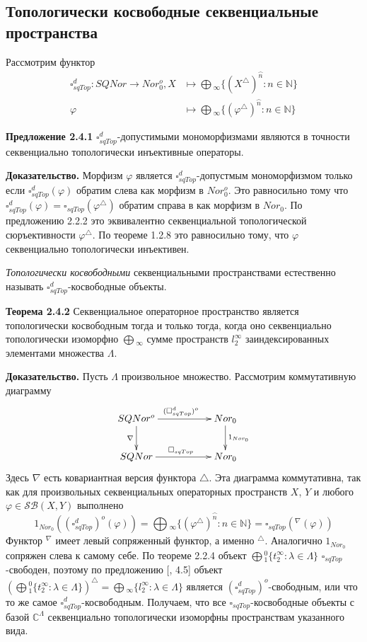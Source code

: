 \documentclass[12pt]{article}
\begin{document}
\subsection{Топологически косвободные секвенциальные пространства}

Рассмотрим 
функтор 
$$
\begin{aligned}
\square_{sqTop}^d : SQNor \to Nor_0^o, X &\mapsto \bigoplus{}_\infty \{(X^{\triangle })^{\wideparen{n}} : n \in \mathbb{N}\}\\
\varphi&\mapsto\bigoplus{}_\infty \{(\varphi^\triangle )^{\wideparen{n}} : n \in \mathbb{N}\}
\end{aligned}
$$

{\bf Предложение 2.4.1}
$\square_{sqTop}^d$-допустимыми мономорфизмами являются в точности секвенциально топологически инъективные операторы.

{\bf Доказательство.}  Морфизм $\varphi$ является $\square_{sqTop}^d$-допустмым мономорфизмом только если $\square_{sqTop}^d(\varphi)$ обратим слева как морфизм в $Nor_0^o$. Это равносильно тому что 
$\square_{sqTop}^d(\varphi)=\square_{sqTop}(\varphi^\triangle)$ обратим справа в как морфизм в $Nor_0$. По предложению 2.2.2 это эквивалентно секвенциальной топологической сюръективности $\varphi^\triangle$. 
По теореме 1.2.8 это равносильно тому, что $\varphi$ секвенциально топологически инъективен.

\medskip

\textit{Топологически косвободными} секвенциальными пространствами естественно называть $\square_{sqTop}^d$-косвободные объекты.

\medskip
 
{\bf Теорема 2.4.2} Секвенциальное операторное пространство является топологически косвободным тогда и только тогда, когда оно секвенциально топологически изоморфно $\bigoplus{}_\infty$ сумме пространств $l_2^\infty$ заиндексированных элементами множества $\Lambda$.


{\bf Доказательство.} Пусть $\Lambda$ произвольное множество. Рассмотрим коммутативную диаграмму
$$
\xymatrix{
SQNor^o \ar[d]_{\nabla } \ar[rr]^{(\square_{sqTop}^d)^o} & & {Nor_0} \ar[d]^{1_{Nor_0}}\\
SQNor\ar[rr]^{\square_{sqTop}} & & {Nor_0}}
$$
Здесь $\nabla$ есть ковариантная версия функтора $\triangle$.
Эта диаграмма коммутативна, так как для произвольных секвенциальных операторных пространств $X$, $Y$ и любого $\varphi\in\mathcal{SB}(X,Y)$ выполнено
$$
1_{Nor_0}((\square_{sqTop}^d)^o(\varphi))
=\bigoplus{}_\infty \{(\varphi^\triangle )^{\wideparen{n}} : n \in \mathbb{N}\}
=\square_{sqTop}({}^\nabla(\varphi))
$$
Функтор ${}^\nabla$ имеет левый сопряженный функтор, а именно ${}^\triangle$. Аналогично $1_{Nor_0}$ сопряжен слева к самому себе. 
По теореме 2.2.4 объект $\bigoplus{}_1^0\{t_2^\infty:\lambda\in\Lambda\}$ $\square_{sqTop}$-свободен, поэтому по предложению [\cite{HelMetrFrQmod}, 4.5] объект 
$(\bigoplus{}_1^0\{t_2^\infty:\lambda\in\Lambda\})^\triangle=\bigoplus{}_\infty\{l_2^\infty:\lambda\in\Lambda\}$ является $(\square_{sqTop}^d)^o$-свободным, или что то же самое $\square_{sqTop}^d$-косвободным. Получаем, что все $\square_{sqTop}$-косвободные объекты с базой 
$\mathbb{C}^\Lambda$ секвенциально топологически изоморфны пространствам указанного вида.
\end{document}
